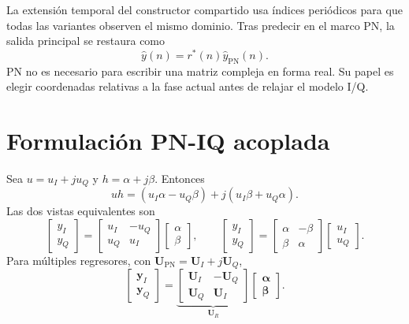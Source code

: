 \documentclass[10pt,a4paper]{article}
\begin{document}
La extensión temporal del constructor compartido usa índices periódicos para
que todas las variantes observen el mismo dominio. Tras predecir en el marco PN,
la salida principal se restaura como
\begin{equation}
 \widehat y(n)=r^*(n)\widehat y_{\mathrm{PN}}(n).
\end{equation}
PN no es necesario para escribir una matriz compleja en forma real. Su papel es
elegir coordenadas relativas a la fase actual antes de relajar el modelo I/Q.

\section{Formulación PN-IQ acoplada}

Sea $u=u_I+ju_Q$ y $h=\alpha+j\beta$. Entonces
\begin{equation}
 uh=(u_I\alpha-u_Q\beta)+j(u_I\beta+u_Q\alpha).
\end{equation}
Las dos vistas equivalentes son
\begin{equation}
 \begin{bmatrix}y_I\\y_Q\end{bmatrix}
 =\begin{bmatrix}u_I&-u_Q\\u_Q&u_I\end{bmatrix}
 \begin{bmatrix}\alpha\\\beta\end{bmatrix},\qquad
 \begin{bmatrix}y_I\\y_Q\end{bmatrix}
 =\begin{bmatrix}\alpha&-\beta\\\beta&\alpha\end{bmatrix}
 \begin{bmatrix}u_I\\u_Q\end{bmatrix}.
 \label{eq:coupled1}
\end{equation}
Para múltiples regresores, con $\mathbf U_{\mathrm{PN}}=\mathbf U_I+j\mathbf U_Q$,
\begin{equation}
 \begin{bmatrix}\mathbf y_I\\\mathbf y_Q\end{bmatrix}
 =\underbrace{\begin{bmatrix}\mathbf U_I&-\mathbf U_Q\\
                 \mathbf U_Q& \mathbf U_I\end{bmatrix}}_{\mathbf U_R}
  \begin{bmatrix}\boldsymbol\alpha\\\boldsymbol\beta\end{bmatrix}.
 \label{eq:coupledmulti}
\end{equation}
\end{document}
